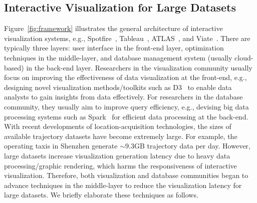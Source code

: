 \subsection{Interactive Visualization for Large Datasets}\label{sec:interactive}






Figure~\ref{fig:framework} illustrates the general architecture of interactive visualization systems,
e.g., Spotfire~\cite{Spotfire}, Tableau~\cite{Tableau}, ATLAS~\cite{chan2008maintaining}, and Viate~\cite{yang2019vaite}.
There are typically three layers: user interface in the front-end layer, optimization techniques in the middle-layer, and database management system (usually cloud-based) in the back-end layer. Researchers in the visualization community usually focus on improving the effectiveness of data visualization at the front-end, e.g., designing novel visualization methods/toolkits such as D3~\cite{d3} to enable data analysts to gain insights from data effectively. For researchers in the database community, they usually aim to improve query efficiency, e.g., devising big data processing systems such as Spark~\cite{spark} for efficient data processing at the back-end. With recent developments of location-acquisition technologies, the sizes of available trajectory datasets have become extremely large. For example, the operating taxis in Shenzhen generate {$\sim$}9.3GB trajectory data per day. However, large datasets increase visualization generation latency due to heavy data processing/graphic rendering, which harms the responsiveness of interactive visualization. Therefore, both visualization and database communities began to advance techniques in the middle-layer to reduce the visualization latency for large datasets. We briefly elaborate these techniques as follows.


